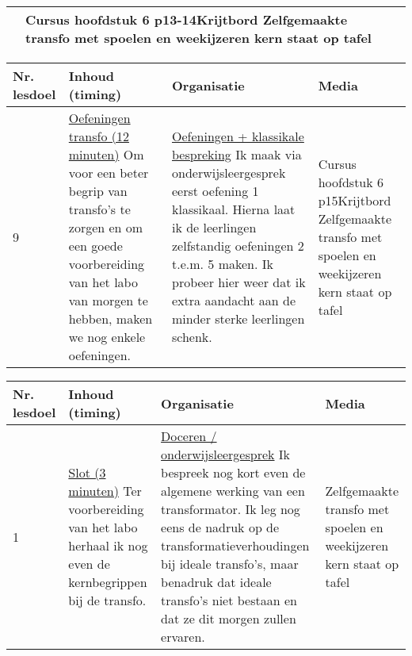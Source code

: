 \begin{landscape}
\begin{tabularx}{1.56\textwidth}{|p{1.5cm}|p{8cm}|X|p{4cm}|}
	&   Cursus hoofdstuk 6 p13-14\newline\newline Krijtbord \newline\newline Zelfgemaakte transfo met spoelen en weekijzeren kern staat op tafel
	\\ \hline
	\end{tabularx}\vspace{5mm}

		\begin{tabularx}{1.56\textwidth}{|p{1.5cm}|p{8cm}|X|p{4cm}|}
		\hline
		\textbf{Nr. lesdoel } & \textbf{Inhoud (timing)}  & \textbf{Organisatie } & \textbf{Media } \\ \hline
		9\newline 10&\underline{Oefeningen transfo (12 minuten)}\newline
		Om voor een beter begrip van transfo's te zorgen en om een goede voorbereiding van het labo van morgen te hebben, maken we nog enkele oefeningen.
		&  \underline{Oefeningen + klassikale bespreking}\newline 
		Ik maak via onderwijsleergesprek eerst oefening 1 klassikaal. Hierna laat ik de leerlingen zelfstandig oefeningen 2 t.e.m. 5 maken. Ik probeer hier weer dat ik extra aandacht aan de minder sterke leerlingen schenk.
		&   Cursus hoofdstuk 6 p15\newline\newline Krijtbord \newline\newline Zelfgemaakte transfo met spoelen en weekijzeren kern staat op tafel
		\\ \hline
	\end{tabularx}\vspace{5mm}

\begin{tabularx}{1.56\textwidth}{|p{1.5cm}|p{8cm}|X|p{4cm}|}
	\hline
	\textbf{Nr. lesdoel } & \textbf{Inhoud (timing)}  & \textbf{Organisatie } & \textbf{Media } \\ \hline
	1&\underline{Slot (3 minuten)}\newline
	Ter voorbereiding van het labo herhaal ik nog even de kernbegrippen bij de transfo.
	&  \underline{Doceren / onderwijsleergesprek}\newline 
	Ik bespreek nog kort even de algemene werking van een transformator. Ik leg nog eens de nadruk op de transformatieverhoudingen bij ideale transfo's, maar benadruk dat ideale transfo's niet bestaan en dat ze dit morgen zullen ervaren.
	& Zelfgemaakte transfo met spoelen en weekijzeren kern staat op tafel
	\\ \hline
\end{tabularx}\vspace{5mm}


\end{landscape}
